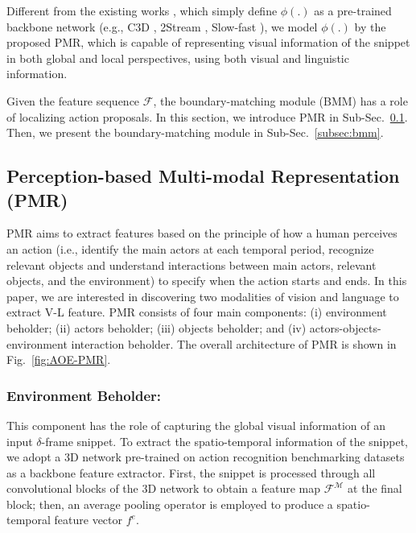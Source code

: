 \documentclass[sn-mathphys]{sn-jnl}
\theoremstyle{thmstyleone}\newtheorem{theorem}{Theorem}\newtheorem{proposition}[theorem]{Proposition}
\theoremstyle{thmstyletwo}\newtheorem{example}{Example}\newtheorem{remark}{Remark}
\theoremstyle{thmstylethree}\newtheorem{definition}{Definition}
\begin{document}
Different from the existing works \cite{BSN++,dbg, gtan_cvpr2019, xu2020gtad, tsi_accv, bmn, lin2018bsn, xu2020gtad, bai2020boundary, tan2021relaxed}, which simply define $\phi(.)$ as a pre-trained backbone network (e.g., C3D \cite{C3D}, 2Stream \cite{2_stream_1}, Slow-fast \cite{SlowFast}), we model $\phi(.)$ by the proposed PMR, which is capable of representing visual information of the snippet in both global and local perspectives, using both visual and linguistic information.

Given the feature sequence $\mathcal{F}$, the boundary-matching module (BMM) has a role of localizing action proposals.
In this section, we introduce PMR in Sub-Sec.~\ref{subsec:pmr}. Then, we present the boundary-matching module in Sub-Sec.~\ref{subsec:bmm}.

\subsection{Perception-based Multi-modal Representation (PMR)}
\label{subsec:pmr}

PMR aims to extract features based on the principle of how a human perceives an action (i.e., identify the main actors at each temporal period, recognize relevant objects and understand interactions between main actors, relevant objects, and the environment) to specify when the action starts and ends. In this paper, we are interested in discovering two modalities of vision and language to extract V-L feature. PMR consists of four main components: (i) environment beholder; (ii) actors beholder; (iii) objects beholder; and (iv) actors-objects-environment interaction beholder. The overall architecture of PMR is shown in Fig.~\ref{fig:AOE-PMR}.





\subsubsection{Environment Beholder:}
\label{subsubsec:env}
This component has the role of capturing the global visual information of an input $\delta$-frame snippet. To extract the spatio-temporal information of the snippet, we adopt a 3D network pre-trained on action recognition benchmarking datasets as a backbone feature extractor. First, the snippet is processed through all convolutional blocks of the 3D network to obtain a feature map $\mathcal{F^M}$ at the final block; then, an average pooling operator is employed to produce a spatio-temporal feature vector $f^{e}$.
\end{document}
